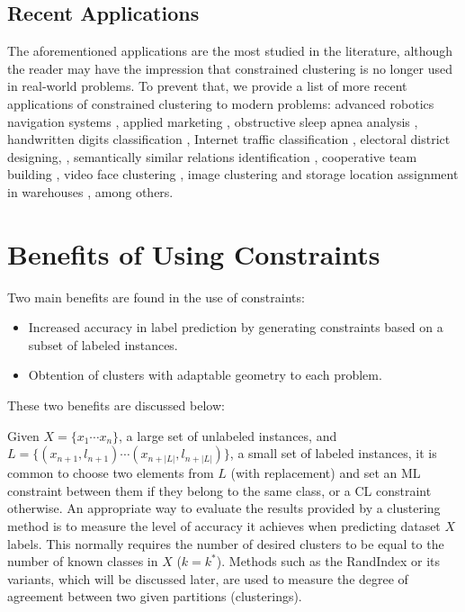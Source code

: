 \subsection{Recent Applications}

The aforementioned applications are the most studied in the literature, although the reader may have the impression that constrained clustering is no longer used in real-world problems. To prevent that, we provide a list of more recent applications of constrained clustering to modern problems: advanced robotics navigation systems \cite{semnani2016constrained}, applied marketing \cite{seret2014new}, obstructive sleep apnea analysis \cite{mai2018evolutionary}, handwritten digits classification \cite{li2015scalable}, Internet traffic classification \cite{wang2014internet}, electoral district designing, \cite{brieden2017constrained}, semantically similar relations identification \cite{wang2015constrained}, cooperative team building \cite{yang2014team}, video face clustering \cite{zhou2014video}, image clustering \cite{habashi2017semi} and storage location assignment in warehouses \cite{yang2016constrained}, among others.

\section{Benefits of Using Constraints} \label{sec:ConstraintsBenefits}

Two main benefits are found in the use of constraints:

\begin{itemize}
	
	\item Increased accuracy in label prediction by generating constraints based on a subset of labeled instances.
	
	\item Obtention of clusters with adaptable geometry to each problem.
	
\end{itemize}

These two benefits are discussed below:

Given $X = \{x_1 \cdots x_n\}$, a large set of unlabeled instances, and $L = \{(x_{n+1}, l_{n+1}) \cdots (x_{n+|L|}, l_{n+|L|})\}$, a small set of labeled instances, it is common to choose two elements from $L$ (with replacement) and set an \acs{ML} constraint between them if they belong to the same class, or a \acs{CL} constraint otherwise. An appropriate way to evaluate the results provided by a clustering method is to measure the level of accuracy it achieves when predicting dataset $X$ labels. This normally requires the number of desired clusters to be equal to the number of known classes in $X$ ($k = k^*$). Methods such as the RandIndex \cite{rand1971objective} or its variants, which will be discussed later, are used to measure the degree of agreement between two given partitions (clusterings).

